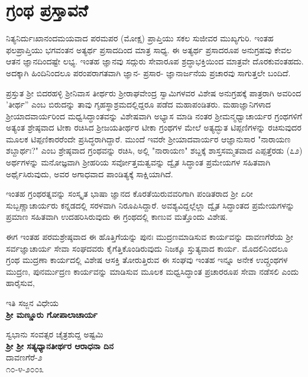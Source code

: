

\begin{center}
\end{center}

\chapter*{ಗ್ರಂಥ ಪ್ರಸ್ತಾವನೆ}

ನಿತ್ಯನಿರ್ದುಃಖಾನಂದಮಯವಾದ ಪರಮಪರ (ಮೋಕ್ಷ) ಪ್ರಾಪ್ತಿಯು ಸಕಲ ಸುಜೀವರ ಮುಖ್ಯಗುರಿ. ಇಂತಹ ಫಲಪ್ರಾಪ್ತಿಯು ಭಗವಂತನ ಅತ್ಯರ್ಥ ಪ್ರಸಾದದಿಂದ ಮಾತ್ರ ಸಾಧ್ಯ. ಈ ಅತ್ಯರ್ಥ ಪ್ರಸಾದರೂಪ ಅನುಗ್ರಹವು ಕೇವಲ ಆತನ ಜ್ಞಾನದಿಂದಷ್ಟೇ ಲಭ್ಯ. ಇಂತಹ ಜ್ಞಾನವು ಸದ್ಗುರು ಸೇವಾರೂಪ ಶ್ರದ್ಧಾಭಕ್ತಿಯಿಂದ ಮಾತ್ರವೇ ದೊರಕುವಂತಹದು. ಅದಕ್ಕಾಗಿ ಹಿಂದಿನಿಂದಲೂ ಪರಂಪರಾಗತವಾಗಿ ಜ್ಞಾನ- ಪ್ರಸಾರ- ಜ್ಞಾನಾರ್ಜನೆಯ ಪ್ರಚಾರವು ಸಾಗುತ್ತಲೇ ಬಂದಿದೆ.

ಪ್ರಸ್ತುತ ಶ‍್ರೀ ಬಿದರಹಳ್ಳಿ ಶ‍್ರೀನಿವಾಸ ತೀರ್ಥರು ಶ‍್ರೀರಾಘವೇಂದ್ರ ಸ್ವಾಮಿಗಳವರ ವಿಶೇಷ ಅನುಗ್ರಹಕ್ಕೆ ಪಾತ್ರರಾಗಿ ಅವರಿಂದ 'ತೀರ್ಥ'' ಎಂಬ ಬಿರುದನ್ನು ತಾವು ಗೃಹಸ್ಥಾಶ್ರಮದಲ್ಲಿದ್ದರೂ ಪಡೆದ ಮಹಾಪಂಡಿತರು. ಮಹಾಜ್ಞಾನಿಗಳಾದ ಶ‍್ರೀಯಾದವಾರ್ಯರಿಂದ ಮಧ್ವಸಿದ್ಧಾಂತವನ್ನು ವಿಶೇಷವಾಗಿ ಅಭ್ಯಾಸ ಮಾಡಿ ನಂತರ ಶ‍್ರೀಮನ್ಮಧ್ವಾಚಾರ್ಯರ ಗ್ರಂಥಗಳಿಗೆ ಅತ್ಯಂತ ಶ್ರೇಷ್ಠವಾದ ಟೀಕಾ ರಚಿಸಿದ ಶ‍್ರೀಜಯತೀರ್ಥರ ಟೀಕಾ ಗ್ರಂಥಗಳ ಮೇಲೆ ಅತ್ಯದ್ಭುತ ಟಿಪ್ಪಣಿಗಳನ್ನು ರಚಿಸುವುದರ ಮೂಲಕ ಟಿಪ್ಪಣಿಕಾರರೆಂದೇ ಪ್ರಸಿದ್ಧರಾಗಿದ್ದಾರೆ. ಮುಂದೆ ಇವರೇ ಶ‍್ರೀಯಾದವಾರ್ಯರ ಆಜ್ಞಾನುಸಾರ "ನಾರಾಯಣ ಶಬ್ದಾರ್ಥಃ?" ಎಂಬ ಶ್ರೇಷ್ಠವಾದ ಗ್ರಂಥವನ್ನು ರಚಿಸಿ, ಅಲ್ಲಿ "ನಾರಾಯಣ" ಶಬ್ದಕ್ಕೆ ಶಾಸ್ತಸಮ್ಮತವಾದ ಎಪ್ಪತ್ತೆರಡು (೭೨) ಅರ್ಥಗಳನ್ನು ಮನೋಜ್ಞವಾಗಿ ಶ‍್ರೀಹರಿಯ ಸರ್ವೋತ್ತಮತ್ವವನ್ನು ದ್ವೈತ ಸಿದ್ಧಾಂತ ಪ್ರಮೇಯಗಳ ಸಹಿತವಾಗಿ ಅರ್ಥೈಸಿರುವುದು, ಅವರ ಅಗಾಧವಾದ ಪಾಂಡಿತ್ಯಕ್ಕೆ ಸಾಕ್ಷಿಯಾಗಿದೆ.

ಇಂತಹ ಗ್ರಂಥರತ್ನವನ್ನು ಸಂಸ್ಕೃತ ಭಾಷಾ ಜ್ಞಾನದ ಕೊರತೆಯಿರುವವರಿಗಾಗಿ ಪಂಡಿತರಾದ ಶ‍್ರೀ ಏರೀ ಸುಬ್ಬಣ್ಣಾಚಾರ್ಯರು ಕನ್ನಡದಲ್ಲಿ ಸರಳವಾಗಿ ನಿರೂಪಿಸಿದ್ದಾರೆ. ಅವಶ್ಯವಿದ್ದಲ್ಲೆಲ್ಲಾ ದ್ವೈತ ಸಿದ್ಧಾಂತದ ಪ್ರಮೇಯಗಳನ್ನು ಪ್ರಮಾಣ ಸಹಿತವಾಗಿ ಉದಹರಿಸಿರುವುದು ಈ ಗ್ರಂಥದಲ್ಲಿ ಕಾಣುವ ಮತ್ತೊಂದು ವಿಶೇಷ.

ಈಗ ಇಂತಹ ಪರಮಶ್ರೇಷ್ಠವಾದ ಈ ಹೊತ್ತಿಗೆಯನ್ನು ಪುನಃ ಮುದ್ರಣಮಾಡಿಸುವ ಕಾರ್ಯವನ್ನು ದಾವಣಗೆರೆಯ ಶ‍್ರೀ ಸರ್ವಜ್ಞಾಚಾರ್ಯ ಸೇವಾ ಸಂಘದವರು ಕೈಗೆತ್ತಿಕೊಂಡಿರುವುದು ನಿಜಕ್ಕೂ ಸ್ತುತ್ಯವಾದ ಕಾರ್ಯ. ಮೊದಲಿನಿಂದಲೂ ಗ್ರಂಥ ಮುದ್ರಣಾ ಕಾರ್ಯದಲ್ಲಿ ವಿಶೇಷ ಆಸಕ್ತಿ ತೋರುತ್ತಿರುವ ಈ ಸಂಘವು ಇಂತಹ ಇನ್ನೂ ಅನೇಕ ಉದ್ಗ್ರಂಥಗಳ ಮುದ್ರಣ, ಪುನರ್ಮುದ್ರಣ ಕಾರ್ಯವನ್ನು ಮಾಡಿಸುವ ಮೂಲಕ ಮಧ್ವಸಿದ್ಧಾಂತ ಪ್ರಚಾರರೂಪ ಸೇವಾ ನಡೆಸಲಿ ಎಂದು ಹಾರೈಸುವ,

\begin{flushright}
ಇತಿ ಸಜ್ಜನ ವಿಧೇಯ\\\textbf{ಶ‍್ರೀ ಮಣ್ಣೂರು ಗೋಪಾಲಾಚಾರ್ಯ}
\end{flushright}

\noindent
ಸ್ವಭಾನು ಸಂವತ್ಸರ ಚೈತ್ರಶುದ್ದ ಅಷ್ಟಮಿ\\\textbf{ಶ‍್ರೀ ಶ‍್ರೀ ಸತ್ಯಧ್ಯಾನತೀರ್ಥರ ಆರಾಧನಾ ದಿನ}\\ ದಾವಣಗೆರೆ-೨\\ ೧೦-೪-೨೦೦೩

